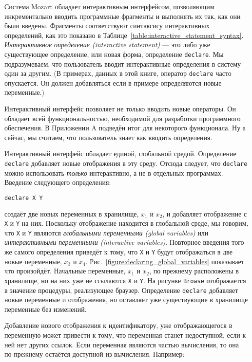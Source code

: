 Система Mozart обладает интерактивным интерфейсом, позволяющим инкрементально вводить программные фрагменты и выполнять их так, как они были введены. Фрагменты соответствуют синтаксису интерактивных определений, как это показано в Таблице~\ref{table:interactive_statement_syntax}. \emph{Интерактивное определение (interactive statement)} --- это либо уже существующее определение, или новая форма, определение \lstinline|declare|. Мы подразумеваем, что пользователь вводит интерактивные определения в систему один за другим. (В примерах, данных в этой книге, оператор \lstinline|declare| часто опускается. Он должен добавляться если в примере определяются новые переменные.)

Интерактивный интерфейс позволяет не только вводить новые операторы. Он обладает всей функциональностью, необходимой для разработки программного обеспечения. В Приложении A подведён итог для некоторого функционала. Ну а сейчас, мы считаем, что пользователь знает как вводить определения.

Интерактивный интерфейс обладает единой, глобальной средой. Определение \lstinline|declare| добавляет новые отображения в эту среду. Отсюда следует, что \lstinline|declare| можно использовать \emph{только} интерактивно, а не в отдельных программах. Введение следующего определения:

\begin{lstlisting}
declare X Y
\end{lstlisting}

создаёт две новых переменных в хранилище, $x_1$ и $x_2$, и добавляет отображение с \lstinline|X| и \lstinline|Y| на них. Поскольку отображение находится в глобальной среде, мы говорим, что \lstinline|X| и \lstinline|Y| являются \emph{глобальными переменными (global variables)} или \emph{интерактивными переменными (interactive variables)}. Повторное введения того же самого определения приведёт к тому, что \lstinline|X| и \lstinline|Y| будут отображаться в две новые переменные, $x_3$ и $x_4$. Рис.~\ref{figure:declaring_global_variables} показывает что произойдёт. Начальные переменные, $x_1$ и $x_2$, по прежнему расположены в хранилище, но на них уже не ссылаются \lstinline|X| и \lstinline|Y|. На рисунке \lstinline|Browse| отображается в значение процедуры, реализующее браузер. Определение \lstinline|declare| добавляет новые переменные и отображения, но оставляет уже существующие в хранилище переменные без изменений.

Добавление нового отображения к идентификатору, уже отображающегося в переменную может привести к тому, что переменная станет недоступной, если к ней нет других ссылок. Если переменная являются частью вычисления, то она по-прежнему остаётся доступной из вычисления. Например:

